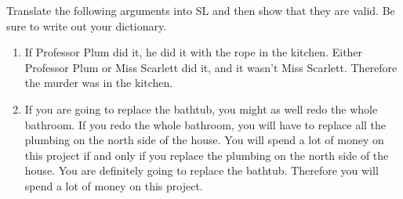 \noindent\problempart
Translate the following arguments into SL and then show that they are valid. Be sure to write out your dictionary. 
\begin{enumerate}[label=(\arabic*)]
\item If Professor Plum did it, he did it with the rope in the kitchen. Either Professor Plum or Miss Scarlett did it, and it wasn't Miss Scarlett. Therefore the murder was in the kitchen.  

%

\item If you are going to replace the bathtub, you might as well redo the whole bathroom. If you redo the whole bathroom, you will have to replace all the plumbing on the north side of the house. You will spend a lot of money on this project if and only if you replace the plumbing on the north side of the house. You are definitely going to replace the bathtub. Therefore you will spend a lot of money on this project. 

%
%


\end{enumerate}

